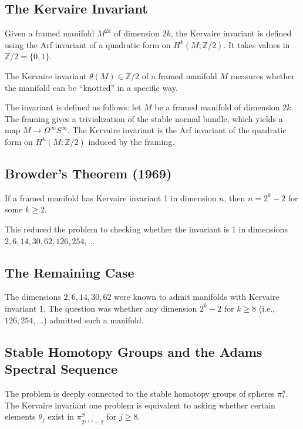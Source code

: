 \subsection{The Kervaire Invariant}

Given a framed manifold $M^{2k}$ of dimension $2k$, the Kervaire invariant is defined using the Arf invariant of a quadratic form on $H^k(M; \mathbb{Z}/2)$. It takes values in $\mathbb{Z}/2 = \{0, 1\}$.

\begin{definition}
The Kervaire invariant $\theta(M) \in \mathbb{Z}/2$ of a framed manifold $M$ measures whether the manifold can be ``knotted'' in a specific way.
\end{definition}

The invariant is defined as follows: let $M$ be a framed manifold of dimension $2k$. The framing gives a trivialization of the stable normal bundle, which yields a map $M \to \Omega^\infty S^\infty$. The Kervaire invariant is the Arf invariant of the quadratic form on $H^k(M; \mathbb{Z}/2)$ induced by the framing.

\subsection{Browder's Theorem (1969)}

\begin{theorem}
If a framed manifold has Kervaire invariant 1 in dimension $n$, then $n = 2^k - 2$ for some $k \geq 2$.
\end{theorem}

This reduced the problem to checking whether the invariant is 1 in dimensions $2, 6, 14, 30, 62, 126, 254, \ldots$

\subsection{The Remaining Case}

The dimensions $2, 6, 14, 30, 62$ were known to admit manifolds with Kervaire invariant 1. The question was whether any dimension $2^k - 2$ for $k \geq 8$ (i.e., $126, 254, \ldots$) admitted such a manifold.

\subsection{Stable Homotopy Groups and the Adams Spectral Sequence}

The problem is deeply connected to the stable homotopy groups of spheres $\pi_*^S$. The Kervaire invariant one problem is equivalent to asking whether certain elements $\theta_j$ exist in $\pi_{2^{j+1}-2}^S$ for $j \geq 8$.

